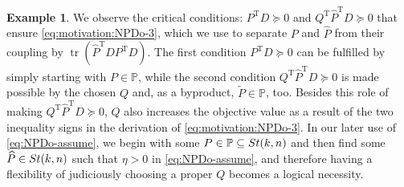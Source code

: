 \documentclass[11pt]{article}
\def\bbP{\mathbb{P}}
\def\wtd{\widetilde}
\def\what{\widehat}
\newcommand\STM[2]{{\rm St}(#1,#2)}
\DeclareMathOperator{\tr}{tr}
\DeclareMathOperator{\T}{T}
\theoremstyle{definition}
\newtheorem{example}{Example}[section]
\numberwithin{equation}{section}
\begin{document}
\begin{example}
We observe the critical conditions: $P^{\T}D\succeq 0$ and $Q^{\T}\what P^{\T}D\succeq 0$
that ensure \eqref{eq:motivation:NPDo-3}, which we use to
separate $P$ and $\what P$ from their coupling by $\tr(\what P^{\T}DP^{\T}D)$.
The first condition $P^{\T}D\succeq 0$ can be fulfilled by simply starting with $P\in\bbP$, while the second
condition $Q^{\T}\what P^{\T}D\succeq 0$ is made possible by the chosen $Q$ and, as a byproduct, $\wtd P\in\bbP$, too.
Besides this role of making $Q^{\T}\what P^{\T}D\succeq 0$, $Q$ also
increases the objective value as a result of the two inequality signs in the derivation of
\eqref{eq:motivation:NPDo-3}.
In our later use of
\eqref{eq:NPDo-assume}, we begin with some $P\in\bbP\subseteq\STM{k}{n}$ and then find some $\what P\in\STM{k}{n}$
such that $\eta>0$ in \eqref{eq:NPDo-assume}, and therefore having a flexibility of
judiciously choosing a proper $Q$ becomes a logical necessity.
\end{example}
\end{document}
